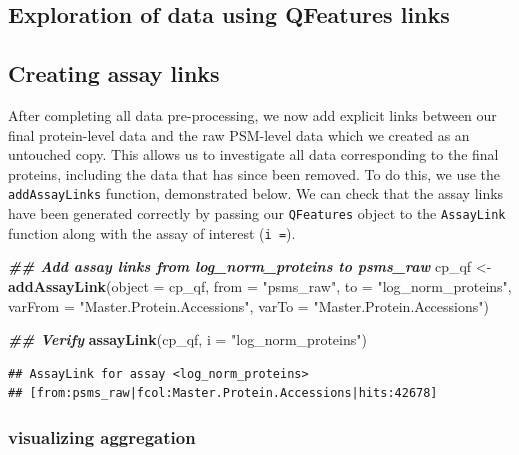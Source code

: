 \documentclass[9pt,a4paper,]{extarticle}
\newenvironment{Shaded}{\begin{snugshade}}{\end{snugshade}}
\newcommand{\AttributeTok}[1]{\textcolor[rgb]{0.13,0.29,0.53}{#1}}
\newcommand{\DocumentationTok}[1]{\textcolor[rgb]{0.56,0.35,0.01}{\textbf{\textit{#1}}}}
\newcommand{\FunctionTok}[1]{\textcolor[rgb]{0.13,0.29,0.53}{\textbf{#1}}}
\newcommand{\NormalTok}[1]{#1}
\newcommand{\OtherTok}[1]{\textcolor[rgb]{0.56,0.35,0.01}{#1}}
\newcommand{\StringTok}[1]{\textcolor[rgb]{0.31,0.60,0.02}{#1}}
\begin{document}
\hypertarget{exploration-of-data-using-qfeatures-links}{%
\subsection{Exploration of data using QFeatures links}\label{exploration-of-data-using-qfeatures-links}}

\hypertarget{creating-assay-links}{%
\subsection{Creating assay links}\label{creating-assay-links}}

After completing all data pre-processing, we now add explicit links between our
final protein-level data and the raw PSM-level data which we created as an
untouched copy. This allows us to investigate all data corresponding to the
final proteins, including the data that has since been removed. To do this, we
use the \texttt{addAssayLinks} function, demonstrated below. We can check that the
assay links have been generated correctly by passing our \texttt{QFeatures} object to
the \texttt{AssayLink} function along with the assay of interest (\texttt{i\ =}).

\begin{Shaded}
\begin{Highlighting}[]
\DocumentationTok{\#\# Add assay links from log\_norm\_proteins to psms\_raw}
\NormalTok{cp\_qf }\OtherTok{\textless{}{-}} \FunctionTok{addAssayLink}\NormalTok{(}\AttributeTok{object =}\NormalTok{ cp\_qf, }
                      \AttributeTok{from =} \StringTok{"psms\_raw"}\NormalTok{,}
                      \AttributeTok{to =} \StringTok{"log\_norm\_proteins"}\NormalTok{,}
                      \AttributeTok{varFrom =} \StringTok{"Master.Protein.Accessions"}\NormalTok{,}
                      \AttributeTok{varTo =} \StringTok{"Master.Protein.Accessions"}\NormalTok{)}

\DocumentationTok{\#\# Verify}
\FunctionTok{assayLink}\NormalTok{(cp\_qf, }
          \AttributeTok{i =} \StringTok{"log\_norm\_proteins"}\NormalTok{)}
\end{Highlighting}
\end{Shaded}

\begin{verbatim}
## AssayLink for assay <log_norm_proteins>
## [from:psms_raw|fcol:Master.Protein.Accessions|hits:42678]
\end{verbatim}

\hypertarget{visualizing-aggregation}{%
\subsubsection{visualizing aggregation}\label{visualizing-aggregation}}
\end{document}
